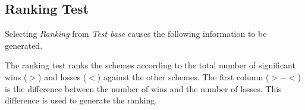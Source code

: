 \subsection{Ranking Test}

Selecting \textit{Ranking} from \textit{Test base} causes the following information to be generated.
\begin{center}
\end{center}

The ranking test ranks the schemes according to the total number of significant wins ($>$) and losses ($<$) against the other schemes. The first column ($>-<$) is the difference between the number of wins and the number of losses. This difference is used to generate the ranking.
